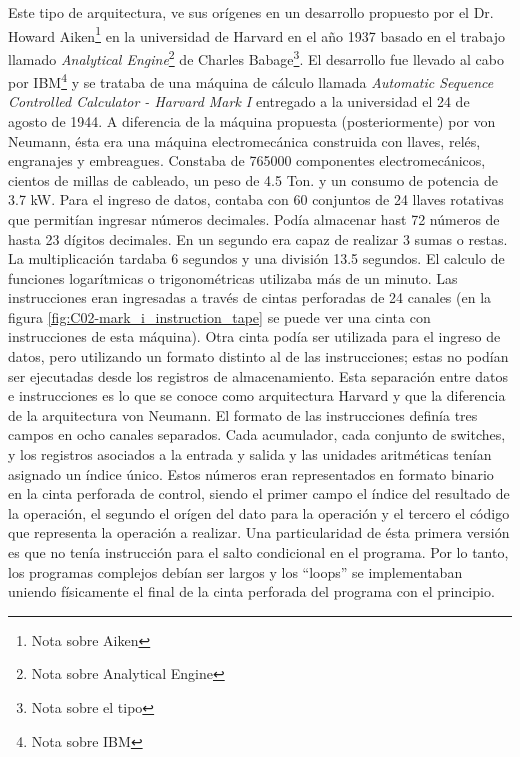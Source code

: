 Este tipo de arquitectura, ve sus orígenes en un desarrollo propuesto por el Dr.
Howard Aiken\footnote{Nota sobre Aiken} en la universidad de Harvard en el año
1937 basado en el trabajo llamado \emph{Analytical Engine}\footnote{Nota sobre
Analytical Engine} de Charles Babage\footnote{Nota sobre el tipo}. El desarrollo
fue llevado al cabo por IBM\footnote{Nota sobre IBM} y se trataba de una máquina
de cálculo llamada \emph{Automatic Sequence Controlled Calculator - Harvard Mark
I} entregado a la universidad el 24 de agosto de 1944. A diferencia de la
máquina propuesta (posteriormente) por von Neumann, ésta era una máquina
electromecánica construida con llaves, relés, engranajes y embreagues. Constaba
de 765000 componentes electromecánicos, cientos de millas de cableado, un peso
de 4.5 Ton. y un consumo de potencia de 3.7 kW. Para el ingreso de datos,
contaba con 60 conjuntos de 24 llaves rotativas que permitían ingresar números
decimales. Podía almacenar hast 72 números de hasta 23 dígitos decimales. En un
segundo era capaz de realizar 3 sumas o restas. La multiplicación tardaba 6
segundos y una división 13.5 segundos. El calculo de funciones logarítmicas o
trigonométricas utilizaba más de un minuto. Las instrucciones eran ingresadas a
través de cintas perforadas de 24 canales (en la figura
\ref{fig:C02-mark_i_instruction_tape} se puede ver una cinta con instrucciones
de esta máquina). Otra cinta podía ser utilizada para el ingreso de datos, pero
utilizando un formato distinto al de las instrucciones; estas no podían ser
ejecutadas desde los registros de almacenamiento. Esta separación entre datos e
instrucciones es lo que se conoce como arquitectura Harvard y que la diferencia
de la arquitectura von Neumann. El formato de las instrucciones definía tres
campos en ocho canales separados. Cada acumulador, cada conjunto de switches, y
los registros asociados a la entrada y salida y las unidades aritméticas tenían
asignado un índice único. Estos números eran representados en formato binario en
la cinta perforada de control, siendo el primer campo el índice del resultado de
la operación, el segundo el orígen del dato para la operación y el tercero el
código que representa la operación a realizar. Una particularidad de ésta
primera versión es que no tenía instrucción para el salto condicional en el
programa. Por lo tanto, los programas complejos debían ser largos y los
``loops'' se implementaban uniendo físicamente el final de la cinta perforada
del programa con el principio.\\
